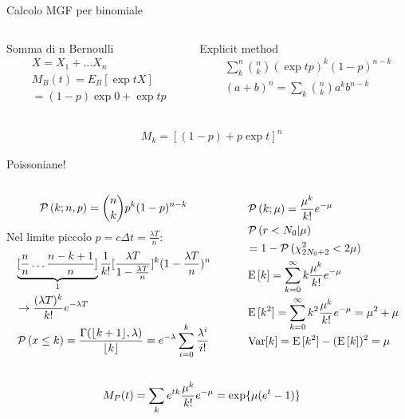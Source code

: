\documentclass[asd-beamer.tex]{subfiles}
\begin{document}
\begin{wordonframe}{Calcolo MGF per binomiale}
\begin{columns}[T]
\begin{column}{0.5\textwidth}
\begin{block}{Somma di n Bernoulli}
\begin{align*}
&X=X_1+\ldots X_n\\
&M_B(t)=E_B[\exp{tX}]\\
&=(1-p)\exp{0}+\exp{t}p
\end{align*}
\end{block}
\end{column}
\begin{column}{0.5\textwidth}
\begin{block}{Explicit method}
\begin{align*}
&\sum_k^n\binom{n}{k}(\exp{t}p)^k(1-p)^{n-k}\\
&(a+b)^n=\sum_k\binom{n}{k}a^kb^{n-k}
\end{align*}
\end{block}
\end{column}
\end{columns}
\begin{align*}
&M_k=[(1-p)+p\exp{t}]^n
\end{align*}
\end{wordonframe}

\begin{frame}{Poissoniane!}
\begin{columns}[T]
	\begin{column}{0.5\textwidth}
\[\operatorname{\mathcal{P}}{(k;n,p)}=\binom{n}{k}p^k(1-p)^{n-k}\]
Nel limite piccolo $p=c\Delta t=\frac{\lambda T}{n}$:
\begin{align*}
&\underbrace{[\frac{n}{n}\ldots\frac{n-k+1}{n}]}_{1}\frac{1}{k!}[\frac{\lambda T}{1-\frac{\lambda T}{n}}]^k(1-\frac{\lambda T}{n})^n\\
&\to\frac{(\lambda T)^k}{k!}e^{-\lambda T}\\
&\operatorname{\mathcal{P}}{(x\leq k)}=\frac{\Gamma(\lfloor k+1\rfloor,\lambda)}{\lfloor k\rfloor}=e^{-\lambda}\sum_{i=0}^k\frac{\lambda^i}{i!}
\end{align*}
	\end{column}
	\begin{column}{0.5\textwidth}
		\begin{align*}
&\operatorname{\mathcal{P}}{(k;\mu)}=\frac{\mu^k}{k!}e^{-\mu}\\
&\operatorname{\mathcal{P}}{(r<N_0|\mu)}\\
&=1-\operatorname{\mathcal{P}}{(\chi^2_{2N_0+2}<2\mu)}\\
&\operatorname{E}{[k]}=\sum_{k=0}^{\infty}k\frac{\mu^k}{k!}e^{-\mu}\\
&\operatorname{E}{[k^2]}=\sum_{k=0}^{\infty}k^2\frac{\mu^k}{k!}e^{-\mu}=\mu^2+\mu\\
&\operatorname{Var}[k]=\operatorname{E}{[k^2]}-(\operatorname{E}{[k]})^2=\mu
\end{align*}
	\end{column}
\end{columns}
\begin{align*}
&M_P(t)=\sum_ke^{tk}\frac{\mu^k}{k!}e^{-\mu}=\text{exp}\{\mu(e^{t}-1)\}
\end{align*}
\end{frame}
\end{document}
